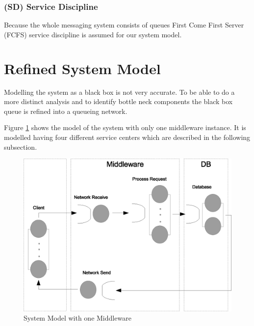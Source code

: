 \documentclass[a4paper]{article}
\begin{document}
\subsubsection{(SD) Service Discipline}
Because the whole messaging system consists of queues  First Come First Server (FCFS) service discipline is assumed for our system model.

\section{Refined System Model}
\label{sec:RefinedSystemModel}

Modelling the system as a black box is not very accurate. To be able to do a more distinct analysis and to identify bottle neck components the black box queue is refined into a queueing network.

Figure \ref{fig:systemmodel-singlebroker} shows the model of the system with only one middleware instance. It is modelled having four different service centers which are described in the following subsection.


\begin{figure}[H]
	\begin{center}
    \includegraphics[scale=0.6]{../drawings-ms2/systemmodel-singlebroker.eps}
  \end{center}
  \caption{System Model with one Middleware}
  \label{fig:systemmodel-singlebroker}
\end{figure}

\end{document}
